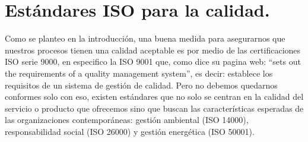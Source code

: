 \documentclass[spanish, fleqn]{article}
\begin{document}
	\section{Estándares ISO para la calidad.}
	Como se planteo en la introducción, una buena medida para asegurarnos que 
	nuestros procesos tienen una calidad aceptable es por medio de las
	certificaciones ISO serie 9000, en especifico la ISO 9001 que, como dice su
	pagina web: ``sets out the requirements of a quality management 
	system''\cite{iso9}, es decir: establece los requisitos de un sistema de 
	gestión de calidad. Pero no debemos quedarnos conformes solo con eso, 
	existen estándares que no solo se centran en la calidad del servicio o 
	producto que ofrecemos sino que buscan las características esperadas de las
	organizaciones contemporáneas: gestión ambiental (ISO 14000\cite{iso14}), 
	responsabilidad social (ISO 26000\cite{iso26}) y gestión energética (ISO
	50001\cite{iso501}).
\end{document}
